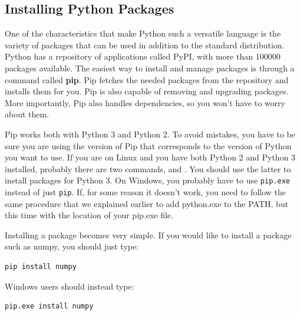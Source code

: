 \subsection{Installing Python Packages}\label{subsec:installing-python-packages2}\label{subsec:installing-python-packages}
One of the characteristics that make Python such a versatile language is the variety of packages that can be used in addition to the standard distribution. Python has a repository of applications called PyPI, with more than 100000 packages available. The easiest way to install and manage packages is through a command called \textbf{pip}. Pip fetches the needed packages from the repository and installs them for you. Pip is also capable of removing and upgrading packages. More importantly, Pip also handles dependencies, so you won't have to worry about them.

Pip works both with Python 3 and Python 2. To avoid mistakes, you have to be sure you are using the version of Pip that corresponds to the version of Python you want to use. If you are on Linux and you have both Python 2 and Python 3 installed, probably there are two commands,  and . You should use the latter to install packages for Python 3. On Windows, you probably have to use \texttt{pip.exe} instead of just \texttt{pip}. If, for some reason it doesn't work, you need to follow the same procedure that we explained earlier to add python.exe to the PATH, but this time with the location of your pip.exe file.


Installing a package becomes very simple. If you would like to install a package such as numpy, you should just type:
\begin{verbatim}
pip install numpy
\end{verbatim}

Windows users should instead type:
\begin{verbatim}
pip.exe install numpy
\end{verbatim}


